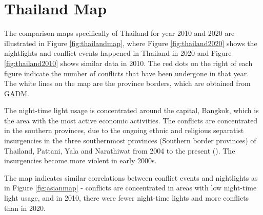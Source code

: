 \documentclass[12pt]{article}
\begin{document}
\section{Thailand Map}
The comparison maps specifically of Thailand for year 2010 and 2020 are illustrated in Figure \ref{fig:thailandmap}, where Figure \ref{fig:thailand2020} shows the nightlights and conflict events happened in Thailand in 2020 and Figure \ref{fig:thailand2010} shows similar data in 2010. The red dots on the right of each figure indicate the number of conflicts that have been undergone in that year. The white lines on the map are the province borders, which are obtained from \href{https://gadm.org/download_country.html#google_vignette}{GADM}. 

The night-time light usage is concentrated around the capital, Bangkok, which is the area with the most active economic activities. The conflicts are concentrated in the southern provinces, due to the ongoing ethnic and religious separatist insurgencies in the three southernmost provinces (Southern border provinces) of Thailand, Pattani, Yala and Narathiwat from 2004 to the present (\cite{Payo01102024}). The insurgencies become more violent in early 2000s. 

The map indicates similar correlations between conflict events and nightlights as in Figure \ref{fig:asianmap} - conflicts are concentrated in areas with low night-time light usage, and in 2010, there were fewer night-time lights and more conflicts than in 2020.
\end{document}
